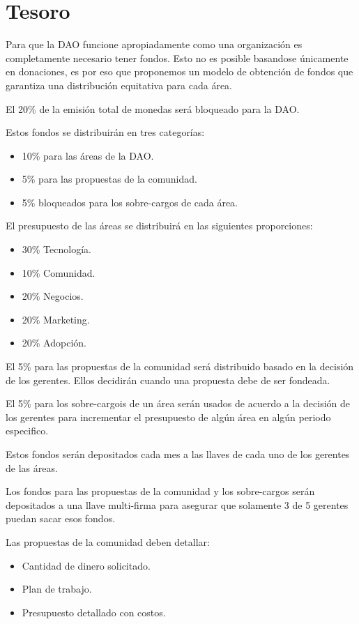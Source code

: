 \documentclass{article}
\begin{document}
\section{Tesoro}

Para que la DAO funcione apropiadamente como una organización es completamente necesario tener fondos. Esto no es posible basandose únicamente en donaciones, es por eso que proponemos un modelo de obtención de fondos que garantiza una distribución equitativa para cada área.

El 20\% de la emisión total de monedas será bloqueado para la DAO.

Estos fondos se distribuirán en tres categorías:

\begin{itemize}
  \item 10\% para las áreas de la DAO.
  \item 5\% para las propuestas de la comunidad.
  \item 5\% bloqueados para los sobre-cargos de cada área.
\end{itemize}

El presupuesto de las áreas se distribuirá en las siguientes proporciones:

\begin{itemize}
  \item 30\% Tecnología.
  \item 10\% Comunidad.
  \item 20\% Negocios.
  \item 20\% Marketing.
  \item 20\% Adopción.
\end{itemize}

El 5\% para las propuestas de la comunidad será distribuido basado en la decisión de los gerentes. Ellos decidirán cuando una propuesta debe de ser fondeada.

El 5\% para los sobre-cargois de un área serán usados de acuerdo a la decisión de los gerentes para incrementar el presupuesto de algún área en algún periodo especifico.

Estos fondos serán depositados cada mes a las llaves de cada uno de los gerentes de las áreas.   

Los fondos para las propuestas de la comunidad y los sobre-cargos serán depositados a una llave multi-firma para asegurar que solamente 3 de 5 gerentes puedan sacar esos fondos.

Las propuestas de la comunidad deben detallar:

\begin{itemize}
  \item Cantidad de dinero solicitado.
  \item Plan de trabajo.
  \item Presupuesto detallado con costos.
\end{itemize}
\end{document}
